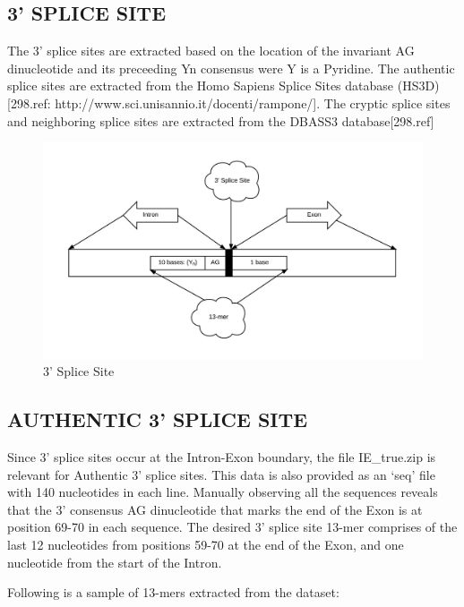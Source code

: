\documentclass[12pt,a4paper]{article}
\begin{document}
	\subsection{3' SPLICE SITE}
	The 3’ splice sites are extracted based on the location of the invariant AG dinucleotide and its preceeding Yn consensus were Y is a Pyridine. The authentic splice sites are extracted from the Homo Sapiens Splice Sites database (HS3D) [298.ref: http://www.sci.unisannio.it/docenti/rampone/]. The cryptic splice sites and neighboring splice sites are extracted from the DBASS3 database[298.ref]
   	\begin{figure}[H]
   		\includegraphics[width=\textwidth]{"threeprime"}
   		\caption{3' Splice Site}
   		\centering
   	\end{figure}

	\subsection{AUTHENTIC 3' SPLICE SITE}
	Since 3’ splice sites occur at the Intron-Exon boundary, the file IE\_true.zip is relevant for Authentic 3’ splice sites. This data is also provided as an ‘seq’ file with 140 nucleotides in each line. Manually observing all the sequences reveals that the 3’ consensus AG dinucleotide that marks the end of the Exon is at position 69-70 in each sequence. The desired 3’ splice site 13-mer comprises of the last 12 nucleotides from positions 59-70 at the end of the Exon, and one nucleotide from the start of the Intron. \par
	Following is a sample of 13-mers extracted from the dataset:
\end{document}
